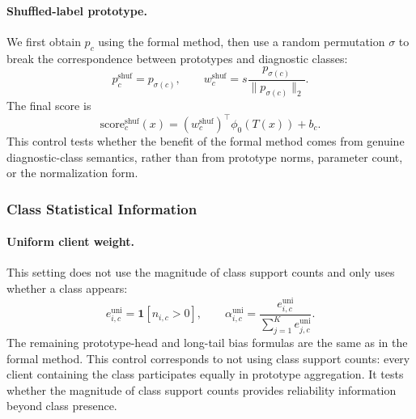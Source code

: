 \documentclass[letterpaper]{article}
\begin{document}
\paragraph{Shuffled-label prototype.}
We first obtain $p_c$ using the formal method, then use a random permutation $\sigma$ to break the correspondence between prototypes and diagnostic classes:
\begin{equation}
p_c^{\mathrm{shuf}}=p_{\sigma(c)},
\qquad
w_c^{\mathrm{shuf}}=s\frac{p_{\sigma(c)}}{\|p_{\sigma(c)}\|_2}.
\end{equation}
The final score is
\begin{equation}
\mathrm{score}_c^{\mathrm{shuf}}(x)
=\left(w_c^{\mathrm{shuf}}\right)^\top\phi_0(T(x))+b_c.
\end{equation}
This control tests whether the benefit of the formal method comes from genuine diagnostic-class semantics, rather than from prototype norms, parameter count, or the normalization form.

\subsubsection{Class Statistical Information}

\paragraph{Uniform client weight.}
This setting does not use the magnitude of class support counts and only uses whether a class appears:
\begin{equation}
e_{i,c}^{\mathrm{uni}}=\mathbf{1}[n_{i,c}>0],
\qquad
\alpha_{i,c}^{\mathrm{uni}}
=\frac{e_{i,c}^{\mathrm{uni}}}{\sum_{j=1}^{K}e_{j,c}^{\mathrm{uni}}}.
\end{equation}
The remaining prototype-head and long-tail bias formulas are the same as in the formal method. This control corresponds to not using class support counts: every client containing the class participates equally in prototype aggregation. It tests whether the magnitude of class support counts provides reliability information beyond class presence.
\end{document}
